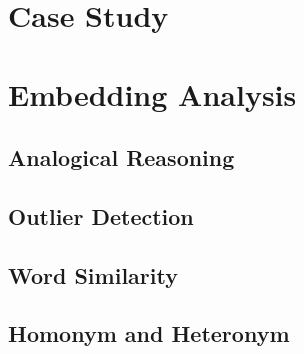 \hspace{24pt}


\section{Case Study} \label{sec:case_study}


\section{Embedding Analysis} \label{sec:analysis}


\subsection{Analogical Reasoning} \label{sec:analysis_analogy}


\subsection{Outlier Detection} \label{sec:analysis_outlier}


\subsection{Word Similarity} \label{sec:analysis_similarity}


\subsection{Homonym and Heteronym} \label{sec:analysis_homonym_heteronym}

